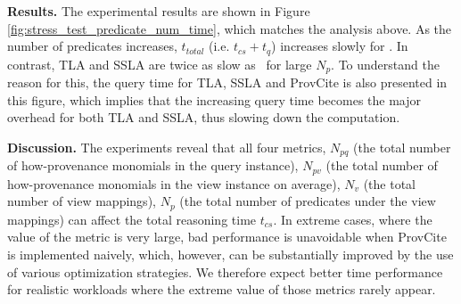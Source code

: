 \textbf{Results.} The experimental results are shown in Figure \ref{fig:stress_test_predicate_num_time}, which matches the analysis above. As the number of predicates increases, $t_{total}$ (i.e. $t_{cs} + t_q$)
increases slowly for \provalg. In contrast, TLA and SSLA are twice as slow as \provalg\ for large $N_p$. To understand the reason for this, the query time for TLA, SSLA and ProvCite is also presented in this figure, which implies that the increasing query time becomes the major overhead for both TLA and SSLA, thus slowing down the computation.

{\bf Discussion.} The experiments reveal that all four metrics, $N_{pq}$ (the total number of how-provenance monomials in the query instance), $N_{pv}$ (the total number of how-provenance monomials in the view instance on average), $N_v$ (the total number of view mappings), $N_p$ (the total number of predicates under the view mappings) can affect the total reasoning time $t_{cs}$. In extreme cases, where the value of the metric is very large, bad performance is unavoidable when ProvCite is implemented naively, which, however, can be substantially improved by the use of various optimization strategies. We therefore expect better time performance for realistic workloads where the extreme value of those metrics rarely appear. 


